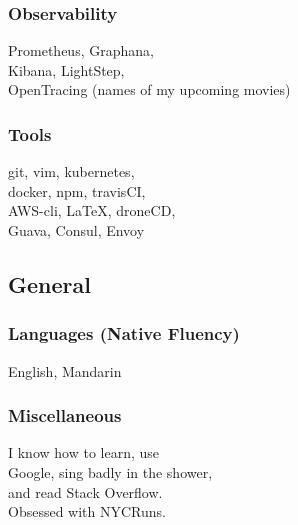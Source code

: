 \documentclass[]{two-column-resume}
\begin{document}
\begin{minipage}[t]{0.34\textwidth}
\subsubsection{Observability}
Prometheus, Graphana,\\
Kibana, LightStep,\\
OpenTracing
(names of my upcoming movies)
\newline

\subsubsection{Tools}
git, vim, kubernetes,\\
docker, npm, travisCI,\\
AWS-cli, \LaTeX, droneCD,\\
Guava, Consul, Envoy\\

\sectionsep

\subsection{General}
\subsubsection{Languages (Native Fluency)}
English, Mandarin
\newline

\subsubsection{Miscellaneous}
I know how to learn, use\\
Google, sing badly in the shower, \\
and read Stack Overflow.\\
Obsessed with NYCRuns.
\setlength{\parindent}{0ex}

\sectionsep




\end{minipage}
\end{document}
